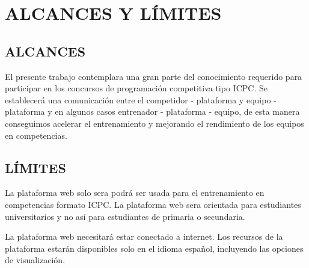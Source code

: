 \section{ALCANCES Y LÍMITES}
    \subsection{ALCANCES}
    El presente trabajo contemplara una gran parte del conocimiento requerido para participar en los concursos de programación competitiva tipo ICPC. Se establecerá una comunicación entre el competidor - plataforma y equipo - plataforma y en algunos casos entrenador - plataforma - equipo, de esta manera conseguimos acelerar el entrenamiento y mejorando el rendimiento de los equipos en competencias.
    \subsection{LÍMITES}
    La plataforma web solo sera podrá ser usada para el entrenamiento en competencias formato ICPC.
    La plataforma web sera orientada para estudiantes universitarios y no así para estudiantes de primaria o secundaria.
    
    La plataforma web necesitará estar conectado a internet.
    Los recursos de la plataforma estarán disponibles solo en el idioma español, incluyendo las opciones de visualización.
    
    